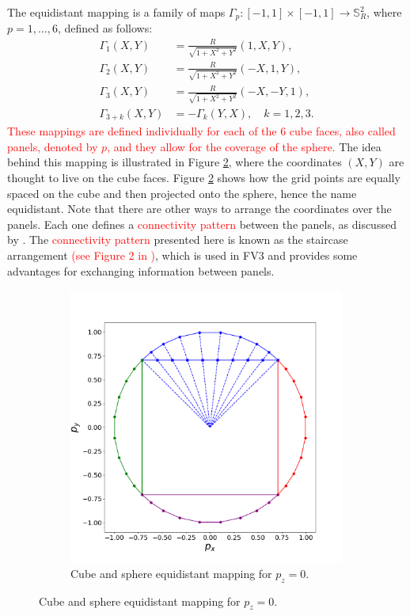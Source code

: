 \documentclass[preprint,12pt]{elsarticle}
\begin{document}
\begin{linenumbers}
The equidistant mapping is a family of maps ${\Gamma}_{p}: [-1,1] \times [-1,1] \to \mathbb{S}^2_R$, where $p=1, \ldots, 6$, defined as follows:
\begin{align}
	\label{gamma_1}
	{\Gamma}_{1}(X,Y) &= \frac{R}{\sqrt{1 + X^2 + Y^2}}(1, X, Y),\\ 
	\label{gamma_2}
	{\Gamma}_{2}(X,Y) &= \frac{R}{\sqrt{1 + X^2 + Y^2}}(-X, 1, Y), \\
	\label{gamma_3}
	{\Gamma}_{3}(X,Y) &= \frac{R}{\sqrt{1 + X^2 + Y^2}}(-X, -Y, 1), \\
	\label{gamma_456}
{\Gamma}_{3+k}(X,Y)&=-{\Gamma}_{k}(Y,X),\quad k=1,2,3.
\end{align}
\textcolor{red}{
These mappings are defined individually for each of the 6 cube faces, also called panels, denoted by $p$, and they allow for the coverage of the sphere.}
The idea behind this mapping is illustrated in Figure \ref{sph-cube-equidist}, where the coordinates $(X,Y)$ are thought to live on the cube faces.
Figure \ref{sph-cube-equidist} shows how the grid points are equally spaced on the cube and then projected onto the sphere, hence the name equidistant.
Note that there are other ways to arrange the coordinates over the panels.
Each one defines a \textcolor{red}{connectivity pattern} between the panels, as discussed by \cite[Section 2.1]{chen:2021}.
The \textcolor{red}{connectivity pattern} presented here is known as the staircase arrangement \textcolor{red}{(see Figure 2 in \cite{chen:2021})}, which is used in FV3 and provides some advantages for exchanging information between panels.
\begin{figure}[!htb]
	\centering
	\begin{subfigure}{0.45\textwidth}
		\centering
		\includegraphics[width=1.1\linewidth]{g1}
		\caption{Cube and sphere equidistant mapping for $p_z=0$.\label{sph-cube-equidist}}
	\end{subfigure}



\end{figure}
\end{linenumbers}
\end{document}

